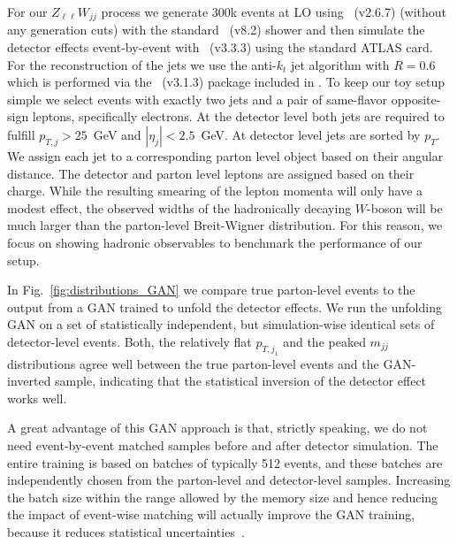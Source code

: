 For our $Z_{\ell \ell} W_{jj}$ process we generate 300k events at LO using
\madgraph~(v2.6.7) \cite{madgraph} (without any generation cuts) with the standard
\pythia~(v8.2) shower \cite{pythia} and then simulate the detector
effects event-by-event with \delphes~(v3.3.3) \cite{delphes}  using the standard
ATLAS card. For the reconstruction of the jets we use the anti-$k_t$ jet algorithm \cite{anti_kt} with $R=0.6$ which is performed via the \fastjet~(v3.1.3) \cite{FastJet} package included in \delphes. To keep our toy setup simple we select events
with exactly two jets and a pair of same-flavor opposite-sign leptons,
specifically electrons. At the detector level both jets
are required to fulfill $p_{T, j} > 25$~GeV and $|\eta_j| <
2.5$~GeV. At detector level jets are sorted by $p_T$. We assign each
jet to a corresponding parton level object based on their angular
distance. The detector and parton level leptons are assigned based on
their charge. While the resulting smearing of the lepton momenta will
only have a modest effect, the observed widths of the hadronically
decaying $W$-boson will be much larger than the parton-level
Breit-Wigner distribution. For this reason, we focus on showing hadronic observables to benchmark the performance of our setup.

In Fig.~\ref{fig:distributions_GAN} we
compare true parton-level events to the output from a GAN trained to
unfold the detector effects.  We run the unfolding GAN on a set of
statistically independent, but simulation-wise identical sets of
detector-level events. Both, the relatively flat $p_{T,j_1}$ and the
peaked $m_{jj}$ distributions agree well between the true parton-level
events and the GAN-inverted sample, indicating that the statistical
inversion of the detector effect works well.

A great advantage of this GAN approach is that, strictly speaking,
we do not need event-by-event matched samples before and after
detector simulation. The entire training is based on batches of
typically 512 events, and these batches are independently chosen
from the parton-level and detector-level samples. Increasing the batch size
within the range allowed by the memory size and hence reducing the impact of
event-wise matching will actually improve the GAN training, because
it reduces statistical uncertainties~\cite{gan_phasespace}.

